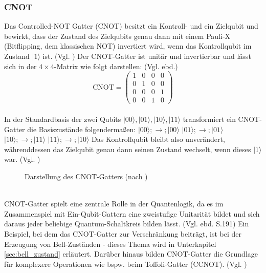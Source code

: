 \subsubsection{CNOT}\label{subsec:cnot_gatter}
Das Controlled-NOT Gatter (CNOT) besitzt ein Kontroll- und ein Zielqubit und bewirkt, dass der Zustand des Zielqubits genau dann mit einem Pauli-X (Bitflipping, dem klassischen NOT) invertiert wird, wenn das Kontrollqubit im Zustand $|1\rangle$ ist. (Vgl. \cite[S.20f., 177f.]{nielsen_quantum_2010}) Der CNOT-Gatter ist unitär und invertierbar und lässt sich in der $4\times 4$-Matrix wie folgt darstellen: (Vgl. ebd.) \\
\begin{equation}
\text{CNOT} = \begin{pmatrix}
1 & 0 & 0 & 0 \\
0 & 1 & 0 & 0 \\
0 & 0 & 0 & 1 \\
0 & 0 & 1 & 0
\end{pmatrix}
\end{equation} \\
In der Standardbasis der zwei Qubits ${|00\rangle, |01\rangle, |10\rangle, |11\rangle}$ transformiert ein CNOT-Gatter die Basiszustände folgendermaßen:
$|00\rangle ;\to; |00\rangle$
$|01\rangle ;\to; |01\rangle$
$|10\rangle ;\to; |11\rangle$
$|11\rangle ;\to; |10\rangle$
Das Kontrollqubit bleibt also unverändert, währenddessen das Zielqubit genau dann seinen Zustand wechselt, wenn dieses $|1\rangle$ war. (Vgl. \cite[S.21]{nielsen_quantum_2010})
\\
\begin{figure}[h]
\centering
{}
\caption{Darstellung des CNOT-Gatters (nach \cite[S.178]{nielsen_quantum_2010})}
\end{figure} \\
CNOT-Gatter spielt eine zentrale Rolle in der Quantenlogik, da es im Zusammenspiel mit Ein-Qubit-Gattern eine zweistufige Unitarität bildet und sich daraus jeder beliebige Quantum-Schaltkreis bilden lässt. (Vgl. ebd. S.191) Ein Beispiel, bei dem das CNOT-Gatter zur Verschränkung beiträgt, ist bei der Erzeugung von Bell-Zuständen - dieses Thema wird in Unterkapitel \ref{sec:bell_zustand} erläutert. Darüber hinaus bilden CNOT-Gatter die Grundlage für komplexere Operationen wie bspw. beim Toffoli-Gatter (CCNOT). (Vgl. \cite[S.5f.]{abughanem_toffoli_2025})



